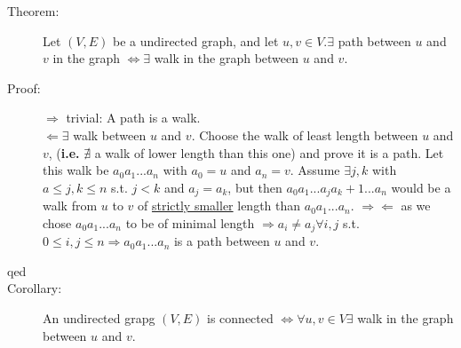 \documentclass[10pt]{article}
\begin{document}
\begin{description}
\begin{enumerate}
\begin{figure}[h!]
			\end{figure}
		\end{enumerate}
		\item[Theorem:] Let $(V, E)$ be a undirected graph, and let $u, v \in V. \exists$ path between $u$ and $v$ in the graph $\Leftrightarrow \exists$ walk in the graph between $u$ and $v$.
		\item[Proof:] $\Rightarrow$ trivial: A path is a walk. \\
		$\Leftarrow \exists$ walk between $u$ and $v$. Choose the walk of least length between $u$ and $v$, (\textbf{i.e.} $\nexists$ a walk of lower length than this one) and prove it is a path. Let this walk be $a_0 a_1 ... a_n$ with $a_0 = u$ and $a_n = v$. Assume $\exists j, k$ with $a \leq j, k \leq n$ s.t. $j < k$ and $a_j = a_k$, but then $a_0 a_1 ... a_j a_k+1 ... a_n$ would be a walk from $u$ to $v$ of \underline{strictly smaller} length than $a_0 a_1 ... a_n$. $\Rightarrow \Leftarrow$ as we chose $a_0 a_1 ... a_n$ to be of minimal length $ \Rightarrow a_i \neq a_j \forall i, j$ s.t. $0 \leq i, j \leq n \Rightarrow a_0 a_1 ... a_n$ is a path between $u$ and $v$.
		\item[qed]
		\item[Corollary:] An undirected grapg $(V, E)$ is connected $\Leftrightarrow \forall u, v \in V \exists$ walk in the graph between $u$ and $v$.
	\end{description}
	
\end{document}
